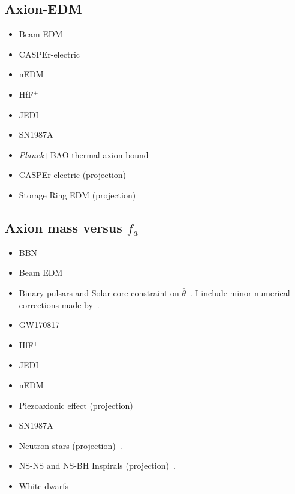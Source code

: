 \documentclass[10pt,twocolumn]{extarticle}
\begin{document}
\begin{mdframed}
\vspace{-1em}
\section{Axion-EDM}\vspace{-0.5em}
\begin{itemize}\setlength\itemsep{-0.5em}
	\item Beam EDM~\cite{Schulthess:2022pbp}
	\item CASPEr-electric~\cite{Aybas:2021nvn}
	\item nEDM~\cite{Abel:2017rtm}
	\item HfF$^+$~\cite{Roussy:2020ily}
	\item JEDI~\cite{JEDI:2022hxa}
	\item SN1987A~\cite{Graham:2013gfa}
	\item \emph{Planck}+BAO thermal axion bound~\cite{Caloni:2022uya}
	\item CASPEr-electric (projection)~\cite{JacksonKimball:2017elr}	
	\item Storage Ring EDM (projection)~\cite{JacksonKimball:2017elr}	
	
\end{itemize}
\end{mdframed}

\newpage


\begin{mdframed}
\vspace{-1em}
\section{Axion mass versus $f_a$}\vspace{-0.5em}
\begin{itemize}\setlength\itemsep{-0.5em}
	\item BBN~\cite{Blum:2014vsa}
	\item Beam EDM~\cite{Schulthess:2022pbp}
	\item Binary pulsars and Solar core constraint on $\bar{\theta}$~\cite{Hook:2017psm}. I include minor numerical corrections made by~\cite{DiLuzio:2021gos,DiLuzio:2021pxd}.
	\item GW170817~\cite{Zhang:2021mks}
	\item HfF$^+$~\cite{Roussy:2020ily}
		\item JEDI~\cite{JEDI:2022hxa}
	\item nEDM~\cite{Abel:2017rtm}
	\item Piezoaxionic effect (projection)~\cite{Arvanitaki:2021wjk}
	\item SN1987A~\cite{Graham:2013gfa}
	\item Neutron stars (projection)~\cite{Hook:2017psm}.
	\item NS-NS and NS-BH Inspirals (projection)~\cite{Hook:2017psm}.
	\item White dwarfs~\cite{Balkin:2022qer}
\end{itemize}
\end{mdframed}
\end{document}
